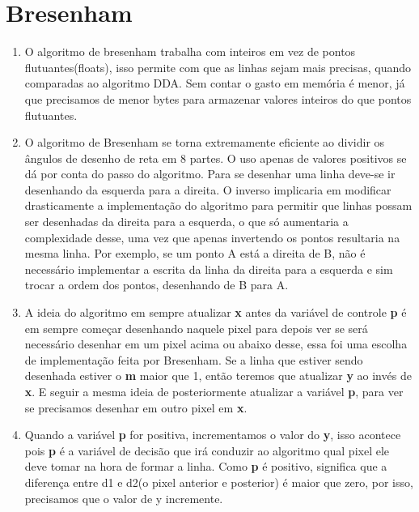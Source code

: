 \section*{Bresenham}

	\begin{enumerate}\addtocounter{enumi}{10}
	
		\item O algoritmo de bresenham trabalha com inteiros em vez de pontos flutuantes(floats),
		isso permite com que as linhas sejam mais precisas, quando comparadas ao algoritmo DDA.
		Sem contar o gasto em memória é menor, já que precisamos de menor bytes para armazenar 	       valores inteiros do que pontos flutuantes.
		
		\item 
O algoritmo de Bresenham se torna extremamente eficiente ao dividir os ângulos de
desenho de reta em 8 partes. O uso apenas de valores positivos se dá por conta do passo do
algoritmo. Para se desenhar uma linha deve-se ir desenhando da esquerda para a
direita. O inverso implicaria em modificar drasticamente a implementação do algoritmo para
permitir que linhas possam ser desenhadas da direita para a esquerda, o que só aumentaria a
complexidade desse, uma vez que apenas invertendo os pontos resultaria na mesma linha. Por
exemplo, se um ponto A está a direita de B, não é necessário implementar a escrita da linha da
direita para a esquerda e sim trocar a ordem dos pontos, desenhando de B para A.

		\item 
A ideia do algoritmo em sempre atualizar \textbf{x} antes da variável de controle \textbf{p} é em
sempre começar desenhando naquele pixel para depois ver se será necessário desenhar em um 
pixel acima ou abaixo desse, essa foi uma escolha de implementação feita por Bresenham. Se a 
linha que estiver sendo desenhada estiver o \textbf{m} maior que 1, então teremos que atualizar 
\textbf{y} ao invés de \textbf{x}. E seguir a mesma ideia de posteriormente atualizar a variável  
\textbf{p}, para ver se precisamos desenhar em outro pixel em \textbf{x}.

		\item 
		Quando a variável \textbf{p} for positiva, incrementamos o valor do \textbf{y},
		isso acontece pois \textbf{p} é a variável de decisão que irá conduzir ao algoritmo
		qual pixel ele deve tomar na hora de formar a linha. Como \textbf{p} é positivo, 
		significa que a diferença entre d1 e d2(o pixel anterior e posterior) é maior que zero,
		por isso, precisamos que o valor de y incremente.


\end{enumerate}
